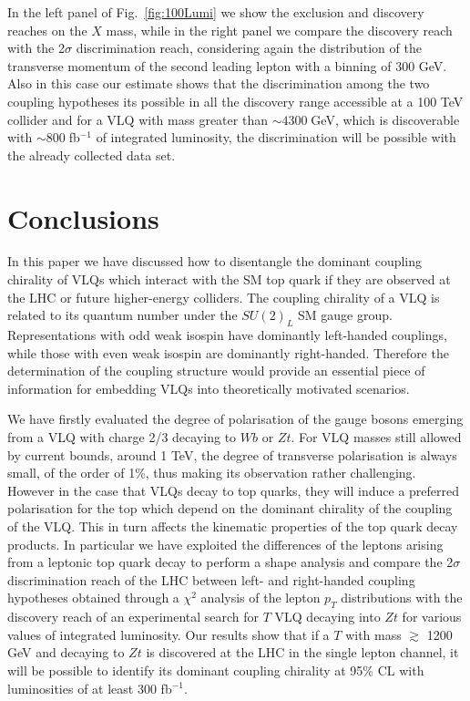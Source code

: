 \documentclass[a4paper]{article}
\begin{document}
In the left panel of Fig.~\ref{fig:100Lumi} we show the exclusion and discovery reaches on the $X$ mass, while in the right panel we compare the discovery reach with the 2$\sigma$ discrimination reach, considering again the distribution of the transverse momentum of the second leading lepton with a binning of 300 GeV. Also in this case our estimate shows that the discrimination among the two coupling hypotheses its possible in all the discovery range accessible at a 100 TeV collider and for a VLQ with mass greater than $\sim 4300\;$GeV, which is discoverable with $\sim 800\;$fb$^{-1}$ of integrated luminosity, the discrimination will be possible with the already collected data set.





\section{Conclusions}
\label{sec:conc}
In this paper we have discussed how to disentangle the dominant coupling chirality of VLQs which interact with the SM top quark if they are observed at the LHC or future higher-energy colliders. The coupling chirality of a VLQ is related to its quantum number under the $SU(2)_L$ SM gauge group. Representations with odd weak isospin have dominantly left-handed couplings, while those with even weak isospin are dominantly right-handed. Therefore the determination of the coupling structure would provide an essential piece of information for embedding VLQs into theoretically motivated scenarios. 

We have firstly evaluated the degree of polarisation of the gauge bosons emerging from a VLQ with charge 2/3 decaying to $Wb$ or $Zt$. For VLQ masses still allowed by current bounds, around 1 TeV, the degree of transverse polarisation is always small, of the order of 1\%, thus making its observation rather challenging.
%
However in the case that VLQs decay to top quarks, they will induce a preferred polarisation for the top which depend on the dominant chirality of the coupling of the VLQ. This in turn affects the kinematic properties of the top quark decay products. In particular we have exploited the differences of the leptons arising from a leptonic top quark decay to perform a shape analysis and compare the 2$\sigma$ discrimination reach of the LHC between left- and right-handed coupling hypotheses  obtained through a $\chi^2$ analysis of the lepton $p_T$ distributions  with the discovery reach of an experimental search for $T$ VLQ decaying into $Zt$ for various values of integrated luminosity.
Our results show that if a $T$ with mass $\gtrsim$ 1200 GeV and decaying to $Zt$ is discovered at the LHC in the single lepton channel, it will be possible to identify its dominant coupling chirality at 95\% CL with luminosities of at least 300 fb$^{-1}$.
\end{document}
